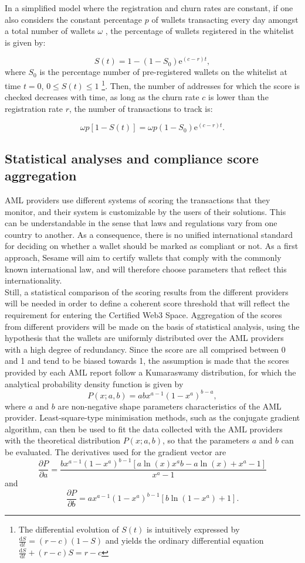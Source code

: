 ﻿\documentclass[a4paper]{article}
\begin{document}
In a simplified model where the registration and churn rates are constant, if one also considers the  constant percentage $p$ of wallets transacting every day amongst a total number of wallets $\omega$ , the percentage of wallets registered in the whitelist is given by:
  
$$S(t)=1-\left(1-S_0\right)\mathrm{e}^{(c-r)t},$$
where $S_0$ is the percentage number of pre-registered wallets on the whitelist at time $t=0$, $0\le S(t)\le 1$
\footnote{The differential evolution of $S(t)$ is intuitively expressed by $\frac{\mathrm{d}S}{\mathrm{d}t}=(r-c)(1-S)$ and yields the ordinary differential equation $\frac{\mathrm{d}S}{\mathrm{d}t}+(r-c)S=r-c$}.
Then, the number of addresses for which the score is checked decreases with time, as long as the churn rate $c$ is lower than the registration rate $r$, the number of transactions to track is:

$$\omega p\left[1-S(t)\right]=\omega p\left(1-S_0\right)\mathrm{e}^{(c-r)t}.$$

\subsection{Statistical analyses and compliance score aggregation}

AML providers use different systems of scoring the transactions that they monitor, and their system is customizable by the users of their solutions. This can be understandable in the sense that laws and regulations vary from one country to another. As a consequence, there is no unified international standard for deciding on whether a wallet should be marked as compliant or not. 
As a first approach, Sesame will aim to certify wallets that comply with the commonly known international law, and will therefore choose parameters that reflect this internationality. \\

Still, a statistical comparison of the scoring results from the different providers will be needed in order to define a coherent score threshold that will reflect the requirement for entering the Certified Web3 Space\texttrademark. Aggregation of the scores from different providers will be made on the basis of statistical analysis, using the hypothesis that the wallets are uniformly distributed over the AML providers with a high degree of redundancy.
Since the score are all comprised between 0 and 1 and tend to be biased towards 1, the assumption is made that the scores
provided by each AML report follow a Kumaraswamy distribution, for which the analytical probability
density function is given by
$$P(x; a,b)=abx^{a-1}\left(1-x^a\right)^{b-a},$$
where $a$ and $b$ are non-negative shape parameters characteristics of the AML provider.
Least-square-type minimisation methods, such as the conjugate gradient algorithm, can then be used
to fit the data collected with the AML providers with the theoretical distribution $P(x; a,b)$, so that the
parameters $a$ and $b$ can be evaluated.
The derivatives used for the gradient vector are 
$$\frac{\partial P}{\partial a}=\frac{bx^{a-1}\left(1-x^a\right)^{b-1}\left[a\ln(x)x^ab
-a\ln(x)+x^a-1\right]}{x^a-1}$$
and
$$\frac{\partial P}{\partial b}=ax^{a-1}\left(1-x^a\right)^{b-1}\left[b\ln(1-x^a)+1\right].$$
\end{document}
